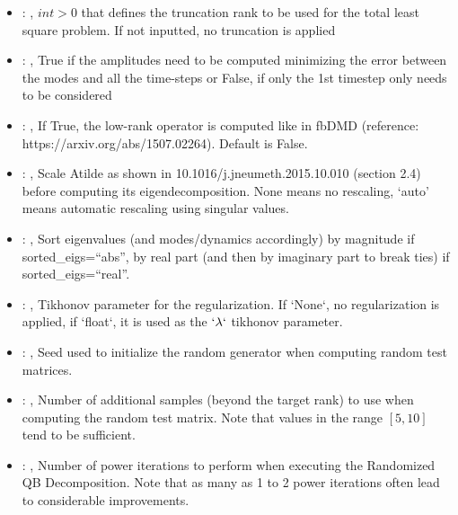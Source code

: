 \begin{itemize}
    \item {}: , 
      $int > 0$ that defines the truncation rank to be used for the total
      least square problem. If not inputted, no truncation is applied

    \item {}: , 
      True if the amplitudes need to be computed minimizing the error
      between the modes and all the time-steps or False, if only the 1st timestep only needs to be
      considered

    \item {}: , 
      If True, the low-rank operator is computed like in fbDMD (reference:
      https://arxiv.org/abs/1507.02264).                                                  Default is
      False.

    \item {}: , 
      Scale Atilde as shown in 10.1016/j.jneumeth.2015.10.010 (section 2.4) before computing its
      eigendecomposition. None means no rescaling, ‘auto’ means automatic rescaling using singular
      values.

    \item {}: , 
      Sort eigenvalues (and modes/dynamics accordingly) by magnitude if sorted\_eigs=``abs'',
      by real part (and then by imaginary part to break ties) if sorted\_eigs=``real''.

    \item {}: , 
      Tikhonov parameter for the regularization.                                                  If
      `None`, no regularization is applied, if `float`, it is used as the
      $`\lambda`$ tikhonov parameter.

    \item {}: , 
      Seed used to initialize the random generator when computing random test matrices.

    \item {}: , 
      Number of additional samples (beyond the target rank) to use when computing the
      random test matrix. Note that values in the range $[5, 10]$ tend to be sufficient.

    \item {}: , 
      Number of power iterations to perform when executing the Randomized QB Decomposition.
      Note that as many as 1 to 2 power iterations often lead to considerable improvements.
  \end{itemize}

